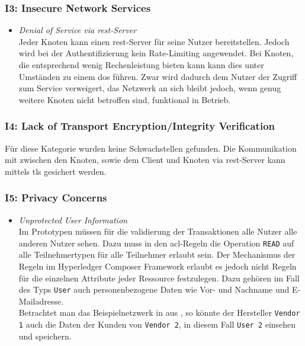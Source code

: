         \subsubsection*{I3: Insecure Network Services}
            \begin{itemize}[leftmargin=0cm,label={}]
                \item \emph{Denial of Service via \gls{rest}-Server}\label{vuln:prototype_dos}\\
        	        Jeder Knoten kann einen \gls{rest}-Server für seine Nutzer bereitstellen. 
        	        Jedoch wird bei der Authentifizierung kein Rate-Limiting angewendet. 
        	        Bei Knoten, die entsprechend wenig Rechenleistung bieten kann kann dies unter Umständen zu einem \gls{dos} führen. 
        	        Zwar wird dadurch dem Nutzer der Zugriff zum Service verweigert, das Netzwerk an sich bleibt jedoch, wenn genug weitere Knoten nicht betroffen sind, funktional in Betrieb.
            \end{itemize}
            
        \subsubsection*{I4: Lack of Transport Encryption/Integrity Verification}
            Für diese Kategorie wurden keine Schwachstellen gefunden. 
            Die Kommunikation mit zwischen den Knoten, sowie dem Client und Knoten via \gls{rest}-Server kann mittels \gls{tls} gesichert werden.
            
        \subsubsection*{I5: Privacy Concerns}
            \begin{itemize}[leftmargin=0cm,label={}]
                \item \emph{Unprotected User Information}\label{vuln:prototype_userdata}\\
                    Im Prototypen müssen für die validierung der Transaktionen alle Nutzer alle anderen Nutzer sehen. 
                    Dazu muss in den \gls{acl}-Regeln die Operation \colorbox{light-gray}{\lstinline{READ}} auf alle Teilnehmertypen für alle Teilnehmer erlaubt sein. 
                    Der Mechanismus der Regeln im Hyperledger Composer Framework erlaubt es jedoch nicht Regeln für die einzelnen Attribute jeder Ressource festzulegen. 
                    Dazu gehören im Fall des Typs \colorbox{light-gray}{\lstinline{User}} auch personenbezogene Daten wie Vor- und Nachname und E-Mailadresse.\\
                    Betrachtet man das Beispielnetzwerk in  aus , so könnte der Hersteller \colorbox{light-gray}{\lstinline{Vendor 1}} auch die Daten der Kunden von \colorbox{light-gray}{\lstinline{Vendor 2}}, in diesem Fall \colorbox{light-gray}{\lstinline{User 2}} einsehen und speichern.
            \end{itemize}
            
